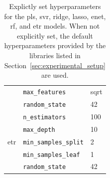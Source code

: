 \begin{table}[!htb]
\begin{tabular}{@{}llp{}@{}}
& \texttt{max\_features} & sqrt \\
& \texttt{random\_state} & 42 \\
\midrule
\multirow{5}{*}{\gls{etr}}
& \texttt{n\_estimators} & 100 \\
& \texttt{max\_depth} & 10 \\
& \texttt{min\_samples\_split} & 2 \\
& \texttt{min\_samples\_leaf} & 1 \\
& \texttt{random\_state} & 42 \\
\midrule
\end{tabular}
\caption{Explictly set hyperparameters for the \gls{pls}, \gls{svr}, ridge, \gls{lasso}, \gls{enet}, \gls{rf}, and \gls{etr} models. When not explicitly set, the default hyperparameters provided by the libraries listed in Section~\ref{sec:experimental_setup} are used.}
\label{tab:combined_hyperparameters}
\end{table}

\FloatBarrier

